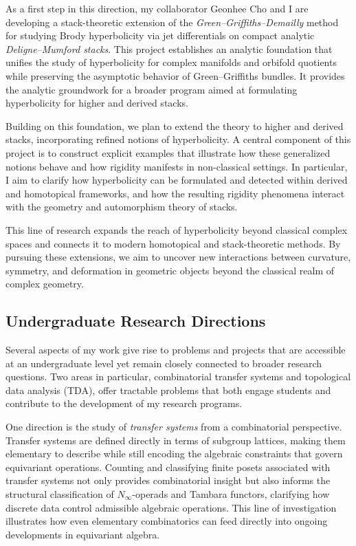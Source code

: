 \documentclass[11pt]{article}
\begin{document}
As a first step in this direction, my collaborator Geonhee Cho and I are developing a stack-theoretic extension of the {\it Green–Griffiths–Demailly} method for studying Brody hyperbolicity via jet differentials on compact analytic {\it Deligne–Mumford stacks}.
This project establishes an analytic foundation that unifies the study of hyperbolicity for complex manifolds and orbifold quotients while preserving the asymptotic behavior of Green–Griffiths bundles.
It provides the analytic groundwork for a broader program aimed at formulating hyperbolicity for higher and derived stacks.

Building on this foundation, we plan to extend the theory to higher and derived stacks, incorporating refined notions of hyperbolicity.
A central component of this project is to construct explicit examples that illustrate how these generalized notions behave and how rigidity manifests in non-classical settings.
In particular, I aim to clarify how hyperbolicity can be formulated and detected within derived and homotopical frameworks, and how the resulting rigidity phenomena interact with the geometry and automorphism theory of stacks.

This line of research expands the reach of hyperbolicity beyond classical complex spaces and connects it to modern homotopical and stack-theoretic methods.
By pursuing these extensions, we aim to uncover new interactions between curvature, symmetry, and deformation in geometric objects beyond the classical realm of complex geometry.

\subsection*{Undergraduate Research Directions}
Several aspects of my work give rise to problems and projects that are accessible at an undergraduate level yet remain closely connected to broader research questions.
Two areas in particular, combinatorial transfer systems and topological data analysis (TDA), offer tractable problems that both engage students and contribute to the development of my research programs.

One direction is the study of {\it transfer systems} from a combinatorial perspective.
Transfer systems are defined directly in terms of subgroup lattices, making them elementary to describe while still encoding the algebraic constraints that govern equivariant operations.
Counting and classifying finite posets associated with transfer systems not only provides combinatorial insight but also informs the structural classification of $N_\infty$-operads and Tambara functors, clarifying how discrete data control admissible algebraic operations.
This line of investigation illustrates how even elementary combinatorics can feed directly into ongoing developments in equivariant algebra.
\end{document}
